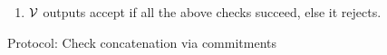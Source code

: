 \begin{figure}[htbp]
\begin{mdframed}
{\begin{enumerate}[leftmargin=1em, label=\arabic*.]
            \begin{itemize}[leftmargin=1em]
                \item $\kzgverify(\srs,\gone{v}, \vec{e}_v, \vec{p}_v, \Pi_v)$ where
                $\vec{p}_v$ = $(s,\omega^m s, \omega^{2m}s)$ and $\vec{e}_v$ = $(\val{s}{v}, \val{\omega^m s}{v}, \val{\omega^{2m} s}{v})$.
                \item $\kzgverify(\srs,\gone{h},  \val{s^3}{h}, s^3,\Pi_h)$.
                \item $\kzgverify(\srs,\gone{f},  \val{s}{Z} + r\val{s}{Q}, s,\Pi_f)$.
                \item $\val{s}{Q}\cdot \val{s}{Z} = \val{s^3}{h}-\val{s}{v}-\gamma \val{\omega^m s}{v}-\gamma^2\val{\omega^{2m}s}{v}$.
            \end{itemize}
            \item $\mathcal{V}$ outputs accept if all the above checks succeed, else it rejects.
        \end{enumerate}
    }
    \end{mdframed}
    \caption{Protocol: Check concatenation via commitments}
    \label{fig:concatenation}
\end{figure}

